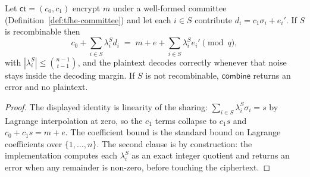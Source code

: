\begin{theorem}
\label{thm:tfhe-recombinable-correctness}
Let $\mathsf{ct} = (c_0, c_1)$ encrypt $m$ under a well-formed committee
(Definition~\ref{def:tfhe-committee}) and let each $i \in S$ contribute
$d_i = c_1 \sigma_i + e_i'$. If $S$ is recombinable then
\[
  c_0 + \sum_{i \in S} \lambda_i^S d_i
  \;=\; m + e + \sum_{i \in S} \lambda_i^S e_i' \pmod q,
\]
with $|\lambda_i^S| \le \binom{n-1}{t-1}$, and the plaintext decodes correctly
whenever that noise stays inside the decoding margin. If $S$ is not
recombinable, $\mathsf{combine}$ returns an error and no plaintext.
\end{theorem}

\begin{proof}
The displayed identity is linearity of the sharing:
$\sum_{i \in S} \lambda_i^S \sigma_i = s$ by Lagrange interpolation at zero,
so the $c_1$ terms collapse to $c_1 s$ and $c_0 + c_1 s = m + e$. The
coefficient bound is the standard bound on Lagrange coefficients over
$\{1,\dots,n\}$. The second clause is by construction: the implementation
computes each $\lambda_i^S$ as an exact integer quotient and returns an error
when any remainder is non-zero, before touching the ciphertext.
\end{proof}

